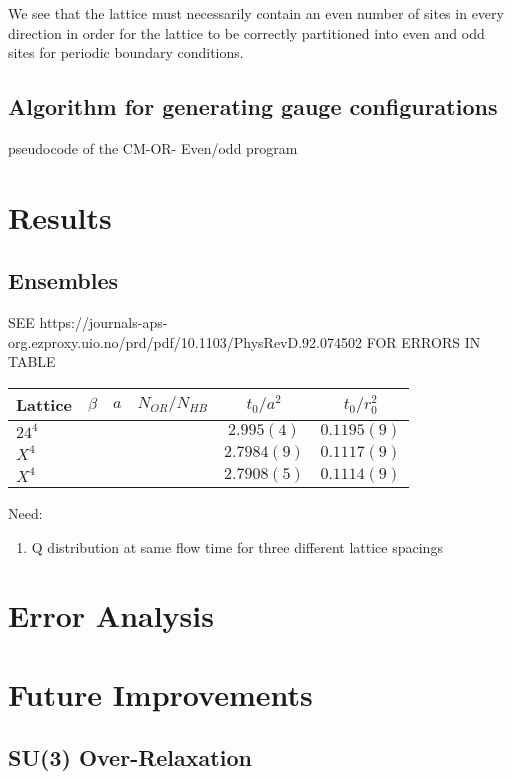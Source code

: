 \documentclass[a4paper,10pt]{article}
\begin{document}
We see that the lattice must necessarily contain an even number of sites in every direction in order for the lattice to be correctly partitioned into even and odd sites for periodic boundary conditions.

\subsection{Algorithm for generating gauge configurations}
pseudocode of the CM-OR- Even/odd program
\section{Results}
\subsection{Ensembles}
SEE 
https://journals-aps-org.ezproxy.uio.no/prd/pdf/10.1103/PhysRevD.92.074502
FOR ERRORS IN TABLE
\begin{tabular}{lccccc}
\hline \hline Lattice & $\beta$ & $a$ & $N_{OR}/N_{HB}$&$t_{0} / a^{2}$ & $t_{0} / r_{0}^{2}$\\
\hline$24^4$& & & &$2.995(4)$ & $0.1195(9)$ \\
$X^4$ & & & &$2.7984(9)$ & $0.1117(9)$ \\
$X^4$ & & & &$2.7908(5)$ & $0.1114(9)$
\end{tabular}

Need:
\begin{enumerate}
\item Q distribution at same flow time for three different lattice spacings
\end{enumerate}
\section{Error Analysis}
\section{Future Improvements}
\subsection{SU(3) Over-Relaxation}
\cite{diffGeom}
\newpage


\end{document}
